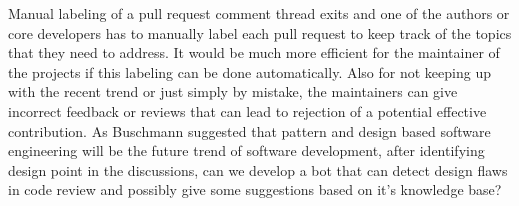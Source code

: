 Manual labeling of a pull request comment thread exits and one of the authors or core developers has to manually label each pull request to keep track of the topics that they need to address. It would be much more efficient for the maintainer of the projects if this labeling can be done automatically. Also for not keeping up with the recent trend or just simply by mistake, the maintainers can give incorrect feedback or reviews that can lead to rejection of a potential effective contribution. As Buschmann \cite{Buschmann2007} suggested that pattern and design based software engineering will be the future trend of software development, after identifying design point in the discussions, can we develop a bot that can detect design flaws in code review and possibly give some suggestions based on it's knowledge base?        


   
